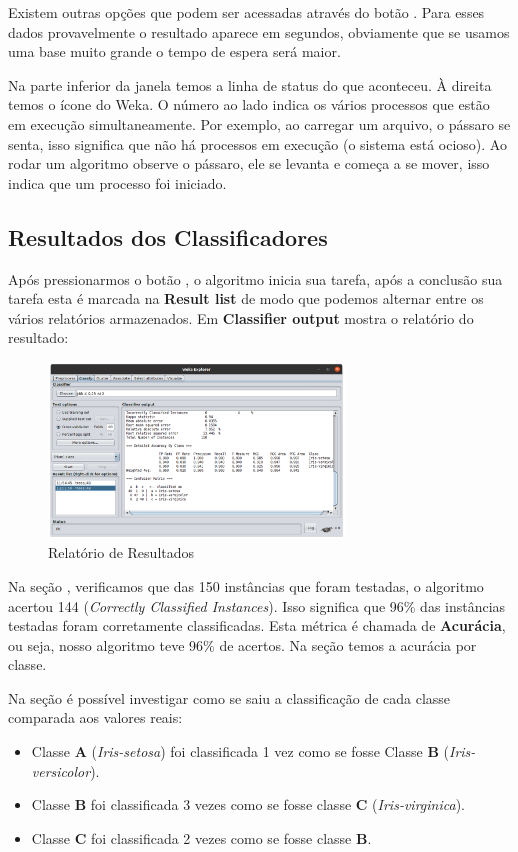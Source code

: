 \documentclass[a4paper,11pt]{article}
\begin{document}
Existem outras opções que podem ser acessadas através do botão . Para esses dados provavelmente o resultado aparece em segundos, obviamente que se usamos uma base muito grande o tempo de espera será maior. 

Na parte inferior da janela temos a linha de status do que aconteceu. À direita temos o ícone do Weka. O número ao lado indica os vários processos que estão em execução simultaneamente. Por exemplo, ao carregar um arquivo, o pássaro se senta, isso significa que não há processos em execução (o sistema está ocioso). Ao rodar um algoritmo observe o pássaro, ele se levanta e começa a se mover, isso indica que um processo foi iniciado.

\subsection{Resultados dos Classificadores}
Após pressionarmos o botão , o algoritmo inicia sua tarefa, após a conclusão sua tarefa esta é marcada na \textbf{Result list} de modo que podemos alternar entre os vários relatórios armazenados. Em \textbf{Classifier output} mostra o relatório do resultado:
\begin{figure}[H]
	\centering
	\includegraphics[width=0.7\textwidth]{imagem/resultados.png}
	\caption{Relatório de Resultados}
\end{figure}

Na seção , verificamos que das 150 instâncias que foram testadas, o algoritmo acertou 144 (\textit{Correctly Classified Instances}). Isso significa que 96\% das instâncias testadas foram corretamente classificadas. Esta métrica é chamada de \textbf{Acurácia}, ou seja, nosso algoritmo teve 96\% de acertos. Na seção  temos a acurácia por classe. 

Na seção  é possível investigar como se saiu a classificação de cada classe comparada aos valores reais:
\begin{itemize}[nolistsep]
	\item Classe \textbf{A} (\textit{Iris-setosa}) foi classificada 1 vez como se fosse Classe \textbf{B} (\textit{Iris-versicolor}).
	\item Classe \textbf{B} foi classificada 3 vezes como se fosse classe \textbf{C} (\textit{Iris-virginica}). 
	\item Classe \textbf{C} foi classificada 2 vezes como se fosse classe \textbf{B}.
\end{itemize}
	
\end{document}
